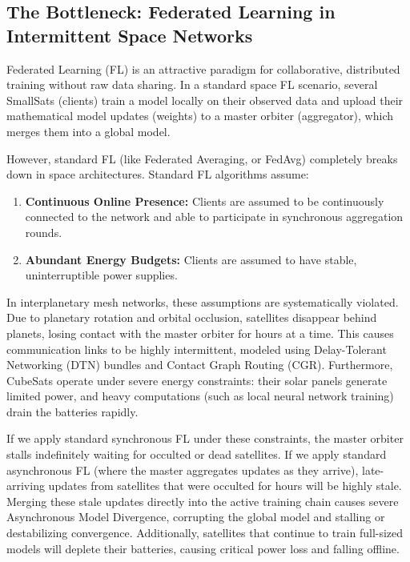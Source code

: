 \documentclass[journal,twocolumn]{IEEEtran}
\newcommand{\cgr}{\textsf{CGR}}
\newcommand{\dtn}{\textsf{DTN}}
\newcommand{\fedavg}{\textsf{FedAvg}}
\begin{document}
\subsection{The Bottleneck: Federated Learning in Intermittent Space Networks}
Federated Learning (FL) is an attractive paradigm for collaborative, distributed training without raw data sharing. In a standard space FL scenario, several SmallSats (clients) train a model locally on their observed data and upload their mathematical model updates (weights) to a master orbiter (aggregator), which merges them into a global model. 

However, standard FL (like Federated Averaging, or \fedavg{}) completely breaks down in space architectures. Standard FL algorithms assume:
\begin{enumerate}
    \item \textbf{Continuous Online Presence:} Clients are assumed to be continuously connected to the network and able to participate in synchronous aggregation rounds.
    \item \textbf{Abundant Energy Budgets:} Clients are assumed to have stable, uninterruptible power supplies.
\end{enumerate}
In interplanetary mesh networks, these assumptions are systematically violated. Due to planetary rotation and orbital occlusion, satellites disappear behind planets, losing contact with the master orbiter for hours at a time. This causes communication links to be highly intermittent, modeled using Delay-Tolerant Networking (\dtn{}) bundles and Contact Graph Routing (\cgr{}). Furthermore, CubeSats operate under severe energy constraints: their solar panels generate limited power, and heavy computations (such as local neural network training) drain the batteries rapidly. 

If we apply standard synchronous FL under these constraints, the master orbiter stalls indefinitely waiting for occulted or dead satellites. If we apply standard asynchronous FL (where the master aggregates updates as they arrive), late-arriving updates from satellites that were occulted for hours will be highly stale. Merging these stale updates directly into the active training chain causes severe Asynchronous Model Divergence, corrupting the global model and stalling or destabilizing convergence. Additionally, satellites that continue to train full-sized models will deplete their batteries, causing critical power loss and falling offline.
\end{document}
